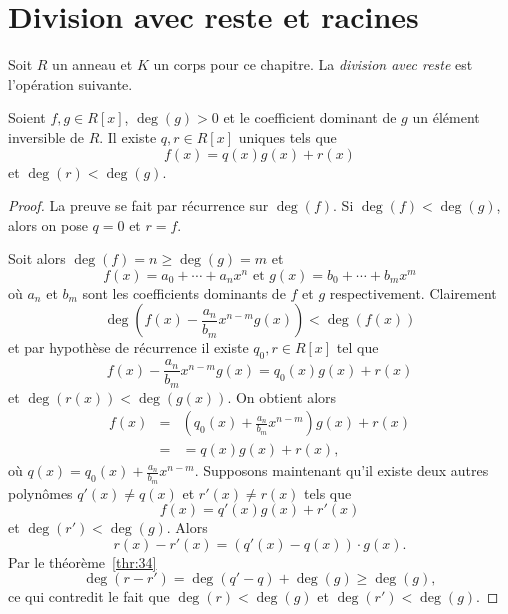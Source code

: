 \section{Division avec reste et  racines} 
\label{sec:divisibilite}

Soit $R$ un anneau et $K$ un corps pour ce chapitre. La \emph{division avec reste} est l'opération suivante. 

\begin{theorem}
  \label{thr:33}
  Soient $f,g \in R[x]$, $\deg(g) >0$ et le coefficient dominant de $g$ un élément  inversible de $R$.   Il existe $q,r \in R[x]$ uniques tels que 
  \begin{displaymath}
    f(x) = q(x) g(x) + r(x) 
  \end{displaymath}
  et $\deg(r) < \deg(g)$. 
\end{theorem}


\begin{proof}
  La preuve se fait par récurrence sur $\deg(f)$. Si $\deg(f) < \deg(g)$, alors on pose $q = 0$ et $r = f$.

Soit alors $\deg(f) = n \geq \deg(g)=m$ et 
\begin{displaymath}
  f(x) = a_0+ \cdots +a_n x^n \text{ et } g(x) = b_0 + \cdots + b_m x^m 
\end{displaymath}
où $a_n$ et $b_m$ sont les coefficients dominants de $f$ et $g$ respectivement. 
Clairement 
\begin{displaymath}
  \deg\left( f(x) - \frac{a_n}{ b_m } x^{n-m} g(x) \right) < \deg(f(x))
\end{displaymath}
et par hypothèse de récurrence il existe $q_0,r ∈R[x]$ tel que 
\begin{displaymath}
  f(x) - \frac{a_n}{ b_m } x^{n-m} g(x)  = q_0(x) g(x) + r(x) 
\end{displaymath}
et $\deg(r(x)) < \deg(g(x))$. On  obtient alors
\begin{eqnarray*}
  f(x) & = &  \left(q_0(x) + \frac{a_n}{ b_m } x^{n-m} \right) g(x) + r(x) \\
       & = & = q(x)g(x) + r(x),
\end{eqnarray*}
 où $q(x) = q_0(x) + \frac{a_n}{ b_m } x^{n-m}$. 
%
Supposons maintenant qu'il existe deux autres polynômes $q'(x) \neq q(x)$ et $r'(x) \neq r(x)$ tels que 
\begin{displaymath}
    f(x) = q'(x) g(x) + r'(x) 
  \end{displaymath}
  et $\deg(r') < \deg(g)$. 
Alors 
\begin{displaymath}
   r(x) - r'(x) = (q'(x) - q(x)) ⋅ g(x). 
\end{displaymath}
Par le théorème~\ref{thr:34}
\begin{displaymath}
 \deg( r - r')  = \deg(q' - q) + \deg(g) \geq \deg(g), 
\end{displaymath}
ce qui contredit le fait que $\deg(r) < \deg(g)$ et $\deg(r') < \deg(g)$. 
\end{proof}


